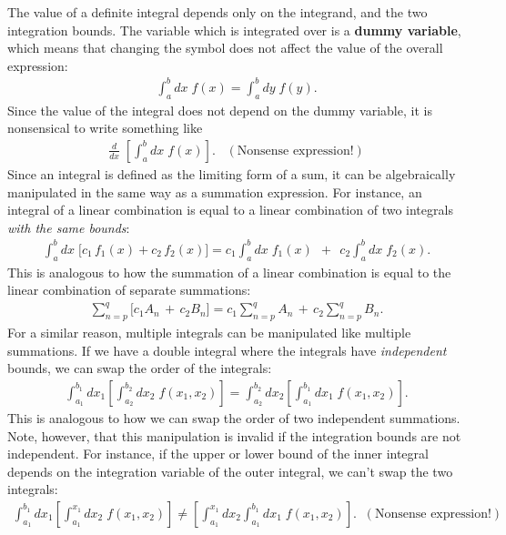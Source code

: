 \documentclass[10pt,a4paper]{article}
\begin{document}
The value of a definite integral depends only on the integrand, and
the two integration bounds. The variable which is integrated over is a
\textbf{dummy variable}, which means that changing the symbol does not
affect the value of the overall expression:
\begin{align}
  \int_a^b dx\; f(x) = \int_a^b dy\; f(y).
\end{align}
Since the value of the integral does not depend on the dummy variable,
it is nonsensical to write something like
\begin{align*}
  \frac{d}{dx}\; \left[\int_a^b dx\; f(x)\right]. \;\;\;(\text{Nonsense expression}!)
\end{align*}
Since an integral is defined as the limiting form of a sum, it can be
algebraically manipulated in the same way as a summation expression.
For instance, an integral of a linear combination is equal to a linear
combination of two integrals \textit{with the same bounds}:
\begin{align}
  \int_a^b dx \;\Big[c_1 \,f_1(x) + c_2\, f_2(x)\Big] = c_1 \int_{a}^{b} dx \; f_1(x)\;\, +\;\, c_2 \int_{a}^{b} dx\; f_2(x).
\end{align}
This is analogous to how the summation of a linear combination is
equal to the linear combination of separate summations:
\begin{align*}
  \sum_{n = p}^{q} \Big[ c_1  A_n \, + \, c_2 B_n\Big] = c_1 \sum_{n = p}^{q} A_n \, + \, c_2 \sum_{n = p}^{q} B_n.
\end{align*}
For a similar reason, multiple integrals can be manipulated like
multiple summations.  If we have a double integral where the integrals
have \textit{independent} bounds, we can swap the order of the
integrals:
\begin{align}
  \int_{a_1}^{b_1} dx_1 \left[ \int_{a_2}^{b_2} dx_2 \; f(x_1, x_2) \right] = \int_{a_2}^{b_2} dx_2 \left[\int_{a_1}^{b_1} dx_1 \; f(x_1, x_2) \right].
\end{align}
This is analogous to how we can swap the order of two independent
summations.  Note, however, that this manipulation is invalid if the
integration bounds are not independent.  For instance, if the upper or
lower bound of the inner integral depends on the integration variable
of the outer integral, we can't swap the two integrals:
\begin{align*}
  \int_{a_1}^{b_1} dx_1 \left[\int_{a_1}^{x_1} dx_2 \; f(x_1, x_2) \right] \ne \left[\int_{a_1}^{x_1} dx_2 \int_{a_1}^{b_1} dx_1 \; f(x_1, x_2)\right].\;\; (\text{Nonsense expression}!)
\end{align*}
\end{document}
